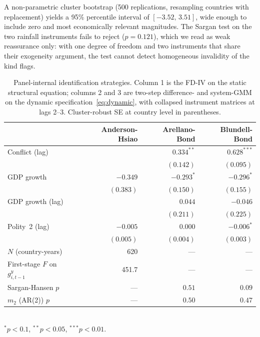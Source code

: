 \documentclass[11pt,a4paper]{article}
\begin{document}
A non-parametric cluster bootstrap (500 replications, resampling
countries with replacement) yields a 95\% percentile interval of
$[-3.52,\,3.51]$, wide enough to include zero and most economically
relevant magnitudes. The Sargan test on the two rainfall instruments
fails to reject ($p = 0.121$), which we read as weak reassurance
only: with one degree of freedom and two instruments that share their
exogeneity argument, the test cannot detect homogeneous invalidity of
the kind \citet{Sarsons2015} flags.

\begin{table}[H]
\centering
\caption{Panel-internal identification strategies. Column 1 is the
\citet{AndersonHsiao1981} FD-IV on the static structural equation;
columns 2 and 3 are two-step difference- and system-GMM on the dynamic
specification~\eqref{eq:dynamic}, with collapsed instrument matrices
at lags 2--3. Cluster-robust SE at country level in parentheses.}
\label{tab:ah}
\small
\begin{tabular}{lrrr}
\toprule
 & Anderson-Hsiao & Arellano-Bond & Blundell-Bond \\
\midrule
Conflict (lag)               &              & $0.334^{**}$  & $0.628^{***}$ \\
                             &              & $(0.142)$     & $(0.095)$     \\
GDP growth                   & $-0.349$     & $-0.293^{*}$  & $-0.296^{*}$  \\
                             & $(0.383)$    & $(0.150)$     & $(0.155)$     \\
GDP growth (lag)             &              & $0.044$       & $-0.046$      \\
                             &              & $(0.211)$     & $(0.225)$     \\
Polity~2 (lag)               & $-0.005$     & $0.000$       & $-0.006^{*}$  \\
                             & $(0.005)$    & $(0.004)$     & $(0.003)$     \\
\midrule
$N$ (country-years)          & 620          & ---           & ---           \\
First-stage $F$ on $g^{y}_{i,t-1}$ & 451.7  & ---           & ---           \\
Sargan-Hansen $p$            & ---          & $0.51$        & $0.09$        \\
$m_2$ (AR(2)) $p$            & ---          & $0.50$        & $0.47$        \\
\bottomrule
\end{tabular}\\[2pt]
\footnotesize $^{*}p<0.1$, $^{**}p<0.05$, $^{***}p<0.01$.
\end{table}
\end{document}
